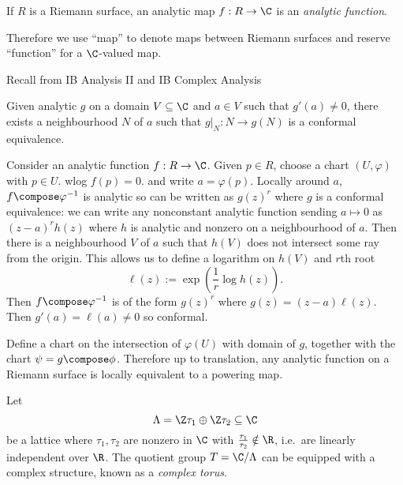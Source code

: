\documentclass[a4paper]{article}
\begin{document}
\begin{definition}
  If \(R\) is a Riemann surface, an analytic map \(f: R \to \C\) is an \emph{analytic function}.
\end{definition}

Therefore we use ``map'' to denote maps between Riemann surfaces and reserve ``function'' for a \(\C\)-valued map.

Recall from IB Analysis II and IB Complex Analysis

\begin{theorem}
  Given analytic \(g\) on a domain \(V \subseteq \C\) and \(a \in V\) such that \(g'(a) \neq 0\), there exists a neighbourhood \(N\) of \(a\) such that \(g|_N : N \to g(N)\) is a conformal equivalence.
\end{theorem}

Consider an analytic function \(f: R \to \C\). Given \(p \in R\), choose a chart \((U, \varphi)\) with \(p \in U\). wlog \(f(p) = 0\). and write \(a = \varphi(p)\). Locally around \(a\), \(f \compose \varphi^{-1}\) is analytic so can be written as \(g(z)^r\) where \(g\) is a conformal equivalence: we can write any nonconstant analytic function sending \(a \mapsto 0\) as \((z - a)^r h(z)\) where \(h\) is analytic and nonzero on a neighbourhood of \(a\). Then there is a neighbourhood \(V\) of \(a\) such that \(h(V)\) does not intersect some ray from the origin. This allows us to define a logarithm on \(h(V)\) and \(r\)th root
\[
  \ell(z) := \exp( \frac{1}{r} \log h(z)).
\]
Then \(f \compose \varphi^{-1}\) is of the form \(g(z)^r\) where \(g(z) = (z - a)\ell(z)\). Then \(g'(a) = \ell(a) \neq 0\) so conformal.

Define a chart on the intersection of \(\varphi(U)\) with domain of \(g\), together with the chart \(\psi = g \compose \phi\). Therefore up to translation, any analytic function on a Riemann surface is locally equivalent to a powering map.

\begin{definition}
  Let
  \[
    \Lambda = \Z \tau_1 \oplus \Z \tau_2 \subseteq \C
  \]
  be a lattice where \(\tau_1, \tau_2\) are nonzero in \(\C\) with \(\frac{\tau_1}{\tau_2} \notin \R\), i.e.\ are linearly independent over \(\R\). The quotient group \(T = \C / \Lambda\) can be equipped with a complex structure, known as a \emph{complex torus}.
\end{definition}
\end{document}
